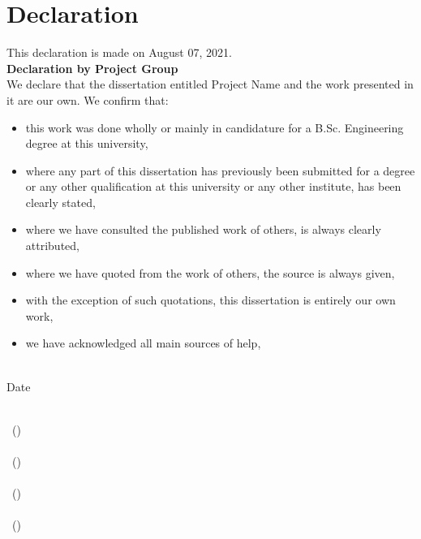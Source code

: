 \chapter*{Declaration}


\begin{flushleft}
	This declaration is made on August 07, 2021. \\
	\vspace{10mm}
	\textbf{Declaration by Project Group} \\
	We declare that the dissertation entitled Project Name and the work presented in it are our own. We confirm that:
	
	\begin{itemize}[noitemsep,topsep=0pt]
		\item this work was done wholly or mainly in candidature for a B.Sc. Engineering degree at this university,
		\item where any part of this dissertation has previously been submitted for a degree or any other qualification at this university or any other institute, has been clearly stated,
		\item where we have consulted the published work of others, is always clearly attributed,
		\item where we have quoted from the work of others, the source is always given,
		\item with the exception of such quotations, this dissertation is entirely our own work,
		\item we have acknowledged all main sources of help,
	\end{itemize}

\vspace{15mm}
\begin{multicols}{2}
	{\makebox[3cm]{\dotfill}} \\ 
	Date
	\vfill\null
	\columnbreak
	
	{\makebox[7cm]{\dotfill}} \\ 
	\memberA \  (\indexA)  \\
	\vspace{12mm}
	{\makebox[7cm]{\dotfill}} \\ 
	\memberB \ (\indexB)  \\
	\vspace{12mm}
	{\makebox[7cm]{\dotfill}} \\ 
	\memberC \ (\indexC)  \\
	\vspace{12mm}
	{\makebox[7cm]{\dotfill}} \\ 
	\memberD \ (\indexD)  \\

\end{multicols}


\end{flushleft}
